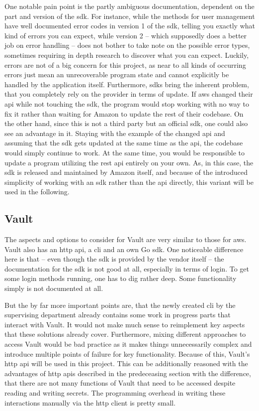One notable pain point is the partly ambiguous documentation, dependent on the part and version of the \ac{sdk}.
For instance, while the methods for user management have well documented error codes in version 1 of the \ac{sdk}, telling you exactly what kind of errors you can expect, while version 2 -- which supposedly does a better job on error handling -- does not bother to take note on the possible error types, sometimes requiring in depth research to discover what you can expect.
Luckily, errors are not of a big concern for this project, as near to all kinds of occurring errors just mean an unrecoverable program state and cannot explicitly be handled by the application itself.
Furthermore, \acp{sdk} bring the inherent problem, that you completely rely on the provider in terms of update.
If \ac{aws} changed their \ac{api} while not touching the \ac{sdk}, the program would stop working with no way to fix it rather than waiting for Amazon to update the rest of their codebase.
On the other hand, since this is not a third party but an official \ac{sdk}, one could also see an advantage in it.
Staying with the example of the changed \ac{api} and assuming that the \ac{sdk} gets updated at the same time as the \ac{api}, the codebase would simply continue to work.
At the same time, you would be responsible to update a program utilizing the \acs{rest} \ac{api} entirely on your own.
As, in this case, the \ac{sdk} is released and maintained by Amazon itself, and because of the introduced simplicity of working with an \ac{sdk} rather than the \ac{api} directly, this variant will be used in the following.

\subsection{Vault}
The aspects and options to consider for Vault are very similar to those for \ac{aws}.
Vault also has an \ac{http} \ac{api}, a \ac{cli} and an own Go \ac{sdk}.
One noticeable difference here is that -- even though the \ac{sdk} is provided by the vendor itself -- the documentation for the \ac{sdk} is not good at all, especially in terms of login.
To get some login methods running, one has to dig rather deep.
Some functionality simply is not documented at all.


But the by far more important points are, that the newly created \ac{cli} by the supervising department already contains some work in progress parts that interact with Vault.
It would not make much sense to reimplement key aspects that these solutions already cover.
Furthermore, mixing different approaches to access Vault would be bad practice as it makes things unnecessarily complex and introduce multiple points of failure for key functionality.
Because of this, Vault's \ac{http} \ac{api} will be used in this project.
This can be additionally reasoned with the advantages of \ac{http} \acp{api} described in the predeceasing section with the difference, that there are not many functions of Vault that need to be accessed despite reading and writing secrets.
The programming overhead in writing these interactions manually via the \ac{http} client is pretty small.

